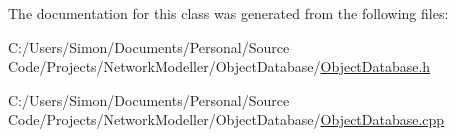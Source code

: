 The documentation for this class was generated from the following files\+:\begin{DoxyCompactItemize}
\item 
C\+:/\+Users/\+Simon/\+Documents/\+Personal/\+Source Code/\+Projects/\+Network\+Modeller/\+Object\+Database/\hyperlink{_object_database_8h}{Object\+Database.\+h}\item 
C\+:/\+Users/\+Simon/\+Documents/\+Personal/\+Source Code/\+Projects/\+Network\+Modeller/\+Object\+Database/\hyperlink{_object_database_8cpp}{Object\+Database.\+cpp}\end{DoxyCompactItemize}
